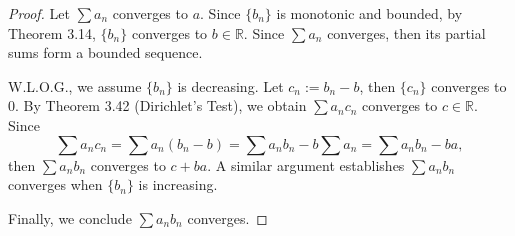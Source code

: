 \begin{Exercise}
\begin{proof}
Let $\sum a_n$ converges to $a$. Since $\{b_n\}$ is monotonic and bounded, by Theorem 3.14, $\{b_n\}$ converges to $b\in\mathbb{R}$. Since $\sum a_n$ converges, then its partial sums form a bounded sequence.

W.L.O.G., we assume $\{b_n\}$ is decreasing. Let $c_n := b_n-b$, then $\{c_n\}$ converges to $0$. By Theorem 3.42 (Dirichlet's Test), we obtain $\sum a_n c_n$ converges to $c\in\mathbb{R}$. Since
$$
\sum a_n c_n
= \sum a_n (b_n-b)
= \sum a_n b_n - b\sum a_n
= \sum a_n b_n - b a,
$$
then $\sum a_n b_n$ converges to $c+b a$. A similar argument establishes $\sum a_n b_n$ converges when $\{b_n\}$ is increasing.

Finally, we conclude $\sum a_n b_n$ converges.
\end{proof}
\end{Exercise}